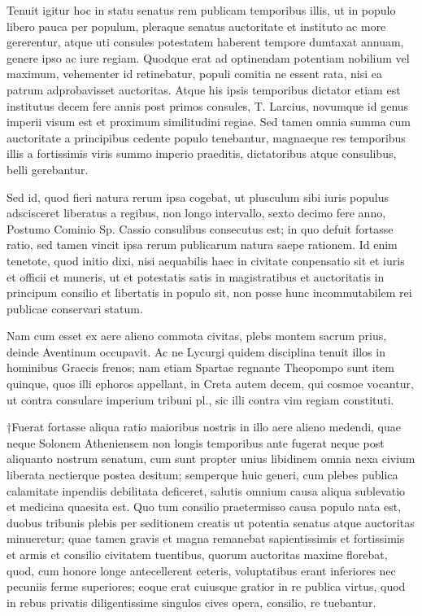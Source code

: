 Tenuit igitur hoc in statu senatus rem publicam temporibus illis, ut in populo libero pauca per populum, pleraque senatus auctoritate et instituto ac more gererentur, atque uti consules potestatem haberent tempore dumtaxat annuam, genere ipso ac iure regiam. Quodque erat ad optinendam potentiam nobilium vel maximum, vehementer id retinebatur, populi comitia ne essent rata, nisi ea patrum adprobavisset auctoritas. Atque his ipsis temporibus dictator etiam est institutus decem fere annis post primos consules, T. Larcius, novumque id genus imperii visum est et proximum similitudini regiae. Sed tamen omnia summa cum auctoritate a principibus cedente populo tenebantur, magnaeque res temporibus illis a fortissimis viris summo imperio praeditis, dictatoribus atque consulibus, belli gerebantur.

 Sed id, quod fieri natura rerum ipsa cogebat, ut plusculum sibi iuris populus adscisceret liberatus a regibus, non longo intervallo, sexto decimo fere anno, Postumo Cominio Sp. Cassio consulibus consecutus est; in quo defuit fortasse ratio, sed tamen vincit ipsa rerum publicarum natura saepe rationem. Id enim tenetote, quod initio dixi, nisi aequabilis haec in civitate conpensatio sit et iuris et officii et muneris, ut et potestatis satis in magistratibus et auctoritatis in principum consilio et libertatis in populo sit, non posse hunc incommutabilem rei publicae conservari statum.

 Nam cum esset ex aere alieno commota civitas, plebs montem sacrum prius, deinde Aventinum occupavit. Ac ne Lycurgi quidem disciplina tenuit illos in hominibus Graecis frenos; nam etiam Spartae regnante Theopompo sunt item quinque, quos illi ephoros appellant, in Creta autem decem, qui cosmoe vocantur, ut contra consulare imperium tribuni pl., sic illi contra vim regiam constituti.

 †Fuerat fortasse aliqua ratio maioribus nostris in illo aere alieno medendi, quae neque Solonem Atheniensem non longis temporibus ante fugerat neque post aliquanto nostrum senatum, cum sunt propter unius libidinem omnia nexa civium liberata nectierque postea desitum; semperque huic generi, cum plebes publica calamitate inpendiis debilitata deficeret, salutis omnium causa aliqua sublevatio et medicina quaesita est. Quo tum consilio praetermisso causa populo nata est, duobus tribunis plebis per seditionem creatis ut potentia senatus atque auctoritas minueretur; quae tamen gravis et magna remanebat sapientissimis et fortissimis et armis et consilio civitatem tuentibus, quorum auctoritas maxime florebat, quod, cum honore longe antecellerent ceteris, voluptatibus erant inferiores nec pecuniis ferme superiores; eoque erat cuiusque gratior in re publica virtus, quod in rebus privatis diligentissime singulos cives opera, consilio, re tuebantur.

